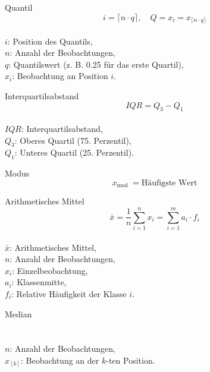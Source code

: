 \begin{minipage}{0.5\columnwidth}
\begin{definition}{Quantil}\\
$$
i=\lceil n \cdot q\rceil, \quad Q=x_{i}=x_{\lceil n \cdot q\rceil}
$$
\\
$i$: Position des Quantils, \\
$n$: Anzahl der Beobachtungen, \\
$q$: Quantilswert (z. B. 0.25 für das erste Quartil), \\
$x_{i}$: Beobachtung an Position $i$.
\end{definition}
\end{minipage}
\begin{minipage}{0.5\columnwidth}
\begin{definition}{Interquartilsabstand}\\
$$
I Q R=Q_{3}-Q_{1}
$$
\\
$IQR$: Interquartilsabstand, \\
$Q_{3}$: Oberes Quartil (75. Perzentil), \\
$Q_{1}$: Unteres Quartil (25. Perzentil).
\end{definition}
\end{minipage}

\begin{definition}{Modus}\\
$$
x_{\text {mod }}=\text{Häufigste Wert}
$$
\end{definition}

\begin{minipage}{0.5\columnwidth}
\begin{concept}{Arithmetisches Mittel}\\
$$
\bar{x}=\frac{1}{n} \sum_{i=1}^{n} x_{i}=\sum_{i=1}^{m} a_{i} \cdot f_{i}
$$
\\
$\bar{x}$: Arithmetisches Mittel, \\
$n$: Anzahl der Beobachtungen, \\
$x_{i}$: Einzelbeobachtung, \\
$a_{i}$: Klassenmitte, \\
$f_{i}$: Relative Häufigkeit der Klasse $i$.
\end{concept}
\end{minipage}%
\begin{minipage}{0.5\columnwidth}
\begin{concept}{Median}\\
\\
\\
$n$: Anzahl der Beobachtungen, \\
$x_{[k]}$: Beobachtung an der $k$-ten Position.
\end{concept}
\end{minipage}


